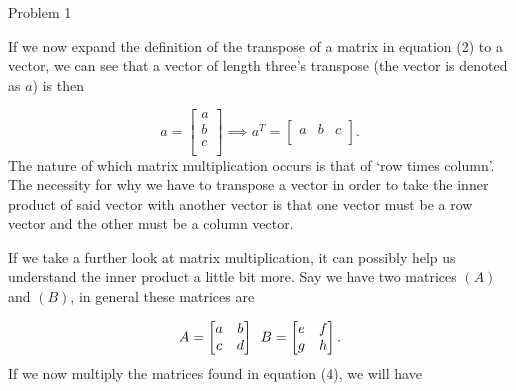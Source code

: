 \begin{problem}{Problem 1}
\begin{Highlight}
        If we now expand the definition of the transpose of a matrix in equation (2) to a vector, we can see that a vector of length three's transpose (the vector is denoted as $a$) is then

        \begin{equation}
            a = 
            \begin{bmatrix}
                a \\
                b \\
                c \\
            \end{bmatrix}
            \implies
            a^{T} = 
            \begin{bmatrix}
                a & b & c \\
            \end{bmatrix}.
        \end{equation}
        The nature of which matrix multiplication occurs is that of `row times column'. The necessity for why we have to transpose a vector in order to take the inner product of said vector with
        another vector is that one vector must be a row vector and the other must be a column vector.

        If we take a further look at matrix multiplication, it can possibly help us understand the inner product a little bit more. Say we have two matrices $(A)$ and $(B)$, in general these matrices
        are

        \begin{equation}
            A = 
            \begin{bmatrix}
                a & b \\
                c & d \\
            \end{bmatrix}
            \hspace*{5pt}
            B = 
            \begin{bmatrix}
                e & f \\
                g & h \\
            \end{bmatrix}.
        \end{equation}
        If we now multiply the matrices found in equation (4), we will have


\end{Highlight}
\end{problem}
